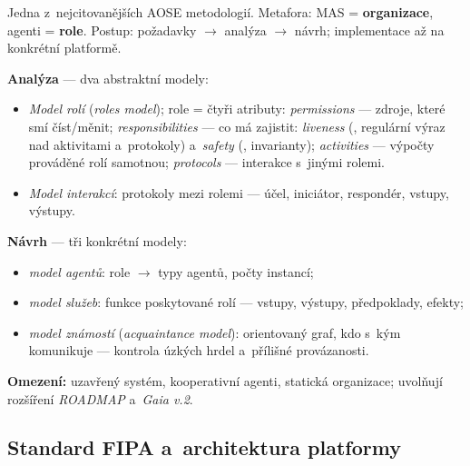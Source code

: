 \documentclass[11pt,a4paper]{article}
\theoremstyle{definition}
\begin{document}
\begin{defbox}
Jedna z~nejcitovanějších AOSE metodologií. Metafora: MAS = \textbf{organizace}, agenti =
\textbf{role}. Postup: požadavky $\to$ analýza $\to$ návrh; implementace až na konkrétní
platformě.

\textbf{Analýza} --- dva abstraktní modely:
\begin{itemize}
\item \emph{Model rolí} (\emph{roles model}); role = čtyři atributy:
  \emph{permissions} --- zdroje, které smí číst/měnit;
  \emph{responsibilities} --- co má zajistit: \emph{liveness} (,
  regulární výraz nad aktivitami a~protokoly) a~\emph{safety} (,
  invarianty);
  \emph{activities} --- výpočty prováděné rolí samotnou;
  \emph{protocols} --- interakce s~jinými rolemi.
\item \emph{Model interakcí}: protokoly mezi rolemi --- účel, iniciátor, respondér, vstupy,
  výstupy.
\end{itemize}

\textbf{Návrh} --- tři konkrétní modely:
\begin{itemize}
\item \emph{model agentů}: role $\to$ typy agentů, počty instancí;
\item \emph{model služeb}: funkce poskytované rolí --- vstupy, výstupy, předpoklady, efekty;
\item \emph{model známostí} (\emph{acquaintance model}): orientovaný graf, kdo s~kým
  komunikuje --- kontrola úzkých hrdel a~přílišné provázanosti.
\end{itemize}

\textbf{Omezení:} uzavřený systém, kooperativní agenti, statická organizace; uvolňují
rozšíření \emph{ROADMAP} a~\emph{Gaia v.2}.
\end{defbox}

\subsection{Standard FIPA a~architektura platformy}
\end{document}
